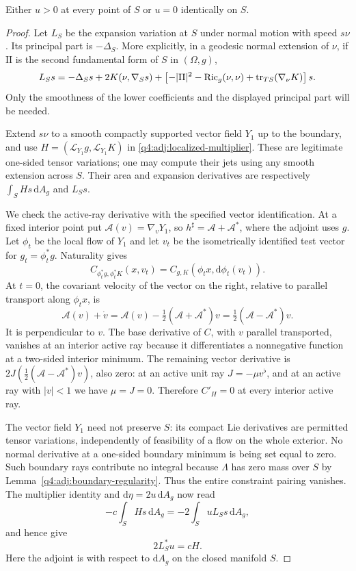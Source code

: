 \begin{lemma}
\label{q4:adj:lapse-dichotomy}
Either $u>0$ at every point of $S$ or $u=0$ identically on $S$.
\end{lemma}

\begin{proof}
Let $L_S$ be the expansion variation at $S$ under normal motion with speed
$s\nu$.  Its principal part is $-\Delta_S$.  More explicitly, in a geodesic
normal extension of $\nu$, if $\mathrm{II}$ is the second fundamental form
of $S$ in $(\Omega,g)$,
\[
 L_Ss=-\Delta_Ss+2K(\nu,\nabla_Ss)
  +\left[-|\mathrm{II}|^2-\operatorname{Ric}_g(\nu,\nu)
          +\operatorname{tr}_{TS}(\nabla_\nu K)\right]s.
\]
Only the smoothness of the lower coefficients and the displayed principal
part will be needed.

Extend $s\nu$ to a smooth compactly supported vector field $Y_1$ up to the
boundary, and use $H=(\mathcal L_{Y_1}g,\mathcal L_{Y_1}K)$ in
\eqref{q4:adj:localized-multiplier}.  These are legitimate one-sided tensor
variations; one may compute their jets using any smooth extension across
$S$.  Their area and expansion derivatives are respectively
$\int_SHs\,\mathrm dA_g$ and $L_Ss$.

We check the active-ray derivative with the specified vector identification.
At a fixed interior point put $\mathcal A(v)=\nabla_vY_1$, so
$h^\sharp=\mathcal A+\mathcal A^*$, where the adjoint uses $g$.
Let $\phi_t$ be the local flow of $Y_1$ and let $v_t$ be the isometrically
identified test vector for $g_t=\phi_t^*g$.  Naturality gives
\[
 C_{\phi_t^*g,\phi_t^*K}(x,v_t)
   =C_{g,K}(\phi_t x,\mathrm d\phi_t(v_t)).
\]
At $t=0$, the covariant velocity of the vector on the right, relative to
parallel transport along $\phi_t x$, is
\[
 \mathcal A(v)+\dot v
 =\mathcal A(v)-\tfrac12(\mathcal A+\mathcal A^*)v
 =\tfrac12(\mathcal A-\mathcal A^*)v.
\]
It is perpendicular to $v$.  The base derivative of $C$, with $v$ parallel
transported, vanishes at an interior active ray because it differentiates
a nonnegative function at a two-sided interior minimum.  The remaining
vector derivative is $2J(\tfrac12(\mathcal A-\mathcal A^*)v)$, also zero:
at an active unit ray $J=-\mu v^\flat$, and at an active ray with $|v|<1$
we have $\mu=J=0$.  Therefore $C'_H=0$ at every interior active ray.

The vector field $Y_1$ need not preserve $S$: its compact Lie derivatives
are permitted tensor variations, independently of feasibility of a flow on
the whole exterior.  No normal derivative at a one-sided boundary minimum
is being set equal to zero.  Such boundary rays contribute no integral
because $\Lambda$ has zero mass over $S$ by
Lemma~\ref{q4:adj:boundary-regularity}.  Thus the entire constraint pairing
vanishes.  The multiplier identity and $\mathrm d\eta=2u\,\mathrm dA_g$
now read
\[
 -c\int_S Hs\,\mathrm dA_g=-2\int_SuL_Ss\,\mathrm dA_g,
\]
and hence give
\begin{equation}
 2L_S^*u=cH.
 \label{q4:adj:boundary-stability-adjoint}
\end{equation}
Here the adjoint is with respect to $\mathrm dA_g$ on the closed manifold
$S$.


\end{proof}
